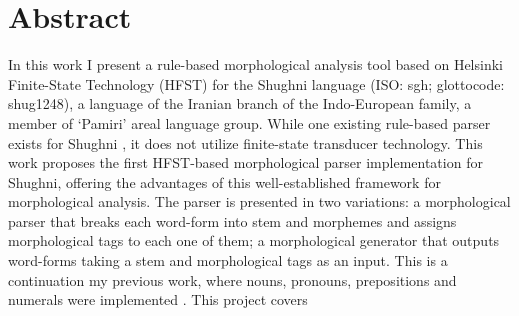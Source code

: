 \section*{Abstract}

In this work I present a rule-based morphological analysis tool based on Helsinki Finite-State Technology (HFST) for the Shughni language (ISO: sgh; glottocode: shug1248), a language of the Iranian branch of the Indo-European family, a member of `Pamiri' areal language group. While one existing rule-based parser exists for Shughni \parencite{melchenko_2021_parser}, it does not utilize finite-state transducer technology. This work proposes the first HFST-based morphological parser implementation for Shughni, offering the advantages of this well-established framework for morphological analysis. The parser is presented in two variations: a morphological parser that breaks each word-form into stem and morphemes and assigns morphological tags to each one of them; a morphological generator that outputs word-forms taking a stem and morphological tags as an input.  This is a continuation my previous work, where nouns, pronouns, prepositions and numerals were implemented \parencite{osorgin_2024_twol}. This project covers 


\newpage